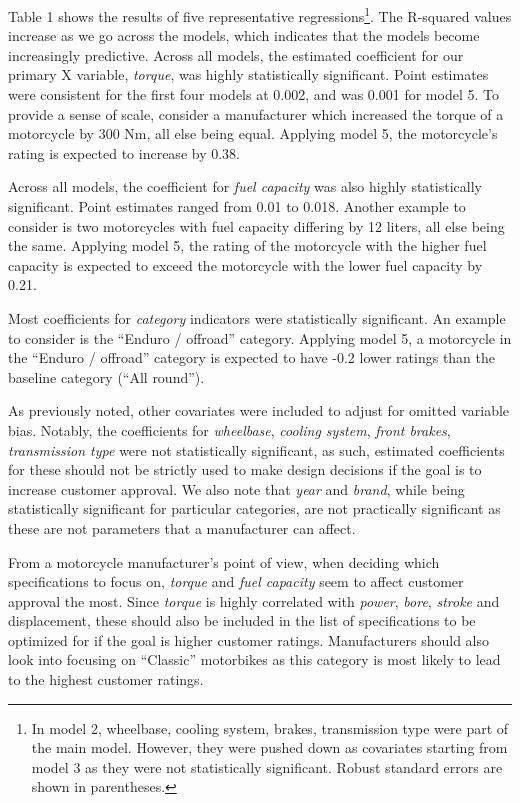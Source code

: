 \documentclass[
]{article}
\begin{document}
Table 1 shows the results of five representative regressions\footnote{In model 2, wheelbase, cooling system, brakes, transmission type
  were part of the main model. However, they were pushed down as
  covariates starting from model 3 as they were not statistically
  significant. Robust standard errors are shown in parentheses.}. The
R-squared values increase as we go across the models, which indicates
that the models become increasingly predictive. Across all models, the
estimated coefficient for our primary X variable, \emph{torque}, was highly
statistically significant. Point estimates were consistent for the first
four models at 0.002, and was
0.001 for model 5. To provide a
sense of scale, consider a manufacturer which increased the torque of a
motorcycle by 300 Nm, all else being equal. Applying model 5, the
motorcycle's rating is expected to increase by
0.38.

Across all models, the coefficient for \emph{fuel capacity} was also highly
statistically significant. Point estimates ranged from
0.01
to
0.018.
Another example to consider is two motorcycles with fuel capacity
differing by 12 liters, all else being the same. Applying model 5, the
rating of the motorcycle with the higher fuel capacity is expected to
exceed the motorcycle with the lower fuel capacity by
0.21.

Most coefficients for \emph{category} indicators were statistically
significant. An example to consider is the ``Enduro / offroad'' category.
Applying model 5, a motorcycle in the ``Enduro / offroad'' category is
expected to have
-0.2 lower ratings
than the baseline category (``All round'').

As previously noted, other covariates were included to adjust for
omitted variable bias. Notably, the coefficients for \emph{wheelbase},
\emph{cooling system}, \emph{front brakes}, \emph{transmission type} were not
statistically significant, as such, estimated coefficients for these
should not be strictly used to make design decisions if the goal is to
increase customer approval. We also note that \emph{year} and \emph{brand}, while
being statistically significant for particular categories, are not
practically significant as these are not parameters that a manufacturer
can affect.

From a motorcycle manufacturer's point of view, when deciding which
specifications to focus on, \emph{torque} and \emph{fuel capacity} seem to affect
customer approval the most. Since \emph{torque} is highly correlated with
\emph{power}, \emph{bore}, \emph{stroke} and displacement, these should also be
included in the list of specifications to be optimized for if the goal
is higher customer ratings. Manufacturers should also look into focusing
on ``Classic'' motorbikes as this category is most likely to lead to the
highest customer ratings.
\end{document}
